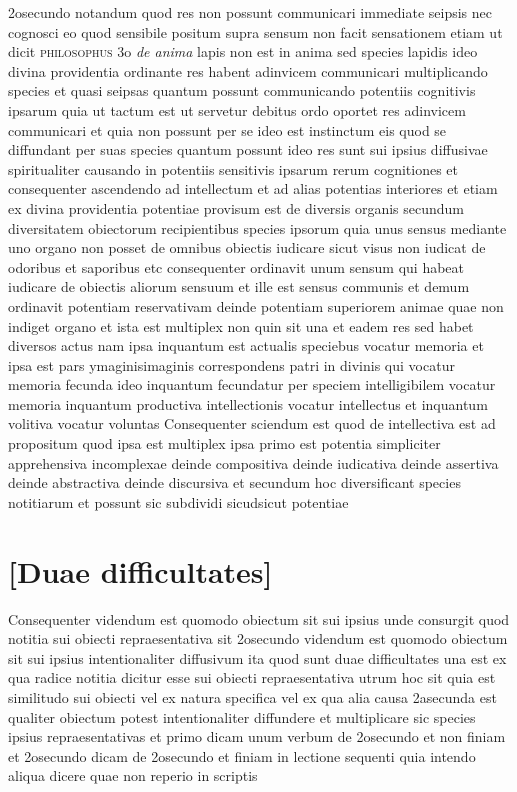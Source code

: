 \documentclass[twoside, openright]{report}
\newcommand{\name}[1]{\textsc{#1}}
\newcommand{\worktitle}[1]{\textit{#1}}
\begin{document}
        \pstart
        2osecundo notandum quod res non possunt communicari immediate seipsis nec cognosci eo quod sensibile positum supra sensum non facit sensationem etiam ut dicit \name{philosophus} 3o \worktitle{de anima} lapis non est in anima sed species lapidis ideo divina providentia ordinante res habent adinvicem communicari multiplicando species et quasi seipsas quantum possunt communicando potentiis cognitivis ipsarum quia ut tactum est ut servetur debitus ordo oportet res adinvicem communicari et quia non possunt per se ideo est instinctum  eis quod se diffundant per suas species quantum possunt ideo res sunt sui ipsius diffusivae spiritualiter causando in potentiis sensitivis ipsarum rerum cognitiones et consequenter ascendendo ad intellectum et ad alias potentias interiores et etiam ex divina providentia potentiae provisum est de diversis organis secundum diversitatem obiectorum recipientibus species ipsorum quia unus sensus mediante uno organo non posset de omnibus obiectis iudicare sicut visus non iudicat de odoribus et saporibus etc consequenter ordinavit unum sensum qui habeat iudicare de obiectis aliorum sensuum et ille est sensus communis et demum ordinavit potentiam reservativam deinde potentiam superiorem animae quae non indiget organo et ista est multiplex non quin sit una et eadem res sed habet diversos actus nam ipsa inquantum est actualis speciebus vocatur memoria et ipsa est pars ymaginisimaginis correspondens patri in divinis qui vocatur memoria fecunda ideo inquantum fecundatur per speciem intelligibilem vocatur memoria inquantum productiva intellectionis vocatur intellectus et inquantum volitiva vocatur voluntas   Consequenter sciendum est quod de intellectiva est ad propositum quod ipsa est multiplex ipsa primo est potentia simpliciter apprehensiva incomplexae deinde compositiva deinde iudicativa deinde assertiva deinde abstractiva deinde discursiva et secundum hoc diversificant species notitiarum et possunt sic subdividi sicudsicut potentiae
        \pend
      
        \bigskip
         \section*{[Duae difficultates]} 
        \pstart
        Consequenter videndum est quomodo obiectum sit sui ipsius unde consurgit quod notitia sui obiecti repraesentativa sit 2osecundo videndum est quomodo obiectum sit sui ipsius intentionaliter diffusivum ita quod sunt duae difficultates una est ex qua radice notitia dicitur esse sui obiecti repraesentativa utrum hoc sit quia est similitudo sui obiecti vel ex natura specifica vel ex qua alia causa  2asecunda est qualiter obiectum potest intentionaliter diffundere et multiplicare sic species ipsius repraesentativas et primo dicam unum verbum de 2osecundo et non finiam et 2osecundo dicam de 2osecundo et finiam in lectione sequenti quia intendo aliqua dicere quae non reperio in scriptis
        \pend
      
\end{document}
